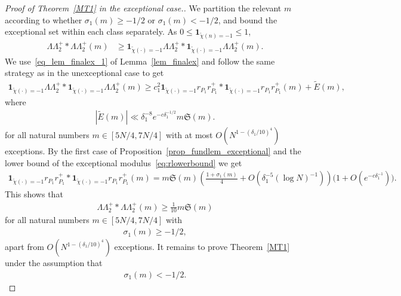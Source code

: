 \documentclass[12pt]{amsart}
\theoremstyle{definition}
\theoremstyle{remark}
\numberwithin{equation}{section}
\newcommand{\1}{\mathbf{1}}
\begin{document}
\begin{proof}[Proof of Theorem~\ref{MT1} in the exceptional case.]

				We partition the relevant $m$ according to whether $\sigma_1(m)\ge -1/2$ or $\sigma_1(m)<-1/2$, and bound the exceptional set within each class separately. As $0\leq \1_{\widetilde{\chi}(n)=-1} \leq 1$,
				\begin{align*}
					\Lambda \Lambda_2^+*\Lambda \Lambda_2^+(m)&\geq \1_{\widetilde{\chi}(\cdot)=-1}\Lambda \Lambda_2^+*\1_{\widetilde{\chi}(\cdot)=-1}\Lambda \Lambda_2^+(m).
				\end{align*}
				We use~\eqref{eq_lem_finalex_1} of Lemma~\ref{lem_finalex} and follow the same strategy as in the unexceptional case to get
				\begin{align*}
					\1_{\widetilde{\chi}(\cdot)=-1}\Lambda \Lambda_2^+*\1_{\widetilde{\chi}(\cdot)=-1}\Lambda \Lambda_2^+(m)\geq c_1^2 \1_{\widetilde{\chi}(\cdot)=-1}r_{P_1} r^+_{P_1}*\1_{\widetilde{\chi}(\cdot)=-1} r_{P_1} r^+_{P_1}(m)+\widetilde{E}(m),
				\end{align*}
				where
				\begin{align*}
					|\widetilde{E}(m)|\ll \delta_1^{-8} e^{-c \delta_1^{-1/2}} m \mathfrak{S}(m).
				\end{align*}
				for all natural numbers $m\in [5N/4,7N/4]$ with at most $O(N^{1-(\delta_1/10)^4})$ exceptions. By the first case of Proposition~\ref{prop_fundlem_exceptional} and the lower bound of the exceptional modulus~\eqref{eq:rlowerbound} we get
				\begin{align*}
					\1_{\widetilde{\chi}(\cdot)=-1}r_{P_1} r^+_{P_1}*\1_{\widetilde{\chi}(\cdot)=-1} r_{P_1} r^+_{P_1}(m)=m \mathfrak{S}(m)\left(\frac{1+\sigma_1(m)}{4}+O(\delta_1^{-5}(\log N)^{-1})\right)\bigl(1+ O(e^{-c \delta_1^{-1}})\bigr).
				\end{align*}
                    This shows that
				\begin{align*}
					\Lambda \Lambda_2^+*\Lambda \Lambda_2^+(m)\geq \frac{1}{10} m \mathfrak{S}(m)
				\end{align*}
				for all natural numbers $m\in [5N/4,7N/4]$ with 
				\begin{align*}
					\sigma_1(m)\geq -1/2,
				\end{align*}
				apart from
				$O(N^{1-(\delta_1/10)^4})$ exceptions.  It remains to prove Theorem~\ref{MT1} under the assumption that
				\begin{align}\label{eq_MT1exceptional_assumptions}
					\sigma_1(m)< -1/2.
				\end{align}
				

\end{proof}
\end{document}
